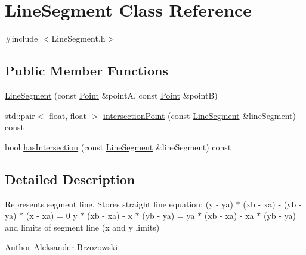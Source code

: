 \hypertarget{classLineSegment}{\section{Line\-Segment Class Reference}
\label{classLineSegment}
}


{\ttfamily \#include $<$Line\-Segment.\-h$>$}

\subsection*{Public Member Functions}
\begin{DoxyCompactItemize}
\item 
\hyperlink{classLineSegment_aedf097c6e1e883c4afa3b73f506ec14a}{Line\-Segment} (const \hyperlink{classPoint}{Point} \&point\-A, const \hyperlink{classPoint}{Point} \&point\-B)
\item 
std\-::pair$<$ float, float $>$ \hyperlink{classLineSegment_a925e2e233b920ca5ddc28e6e069217d1}{intersection\-Point} (const \hyperlink{classLineSegment}{Line\-Segment} \&line\-Segment) const 
\item 
bool \hyperlink{classLineSegment_ac7c1a4f6079ce306b855d5d438abbcb7}{has\-Intersection} (const \hyperlink{classLineSegment}{Line\-Segment} \&line\-Segment) const 
\end{DoxyCompactItemize}


\subsection{Detailed Description}
Represents segment line. Stores straight line equation\-: (y -\/ ya) $\ast$ (xb -\/ xa) -\/ (yb -\/ ya) $\ast$ (x -\/ xa) = 0 y $\ast$ (xb -\/ xa) -\/ x $\ast$ (yb -\/ ya) = ya $\ast$ (xb -\/ xa) -\/ xa $\ast$ (yb -\/ ya) and limits of segment line (x and y limits) \begin{DoxyAuthor}{Author}
Aleksander Brzozowski 
\end{DoxyAuthor}


